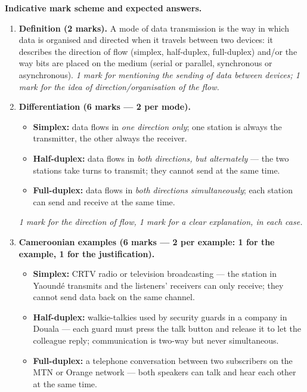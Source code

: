 \documentclass[11pt]{article}
\begin{document}
\begin{corrige}
\textbf{Indicative mark scheme and expected answers.}

\begin{enumerate}
\item \textbf{Definition (2 marks).} A mode of data transmission is the way in which data is organised and directed when it travels between two devices: it describes the direction of flow (simplex, half-duplex, full-duplex) and/or the way bits are placed on the medium (serial or parallel, synchronous or asynchronous). \emph{1 mark for mentioning the sending of data between devices; 1 mark for the idea of direction/organisation of the flow.}

\item \textbf{Differentiation (6 marks — 2 per mode).}
\begin{itemize}
\item \textbf{Simplex:} data flows in \emph{one direction only}; one station is always the transmitter, the other always the receiver.
\item \textbf{Half-duplex:} data flows in \emph{both directions, but alternately} — the two stations take turns to transmit; they cannot send at the same time.
\item \textbf{Full-duplex:} data flows in \emph{both directions simultaneously}; each station can send and receive at the same time.
\end{itemize}
\emph{1 mark for the direction of flow, 1 mark for a clear explanation, in each case.}

\item \textbf{Cameroonian examples (6 marks — 2 per example: 1 for the example, 1 for the justification).}
\begin{itemize}
\item \textbf{Simplex:} CRTV radio or television broadcasting — the station in Yaoundé transmits and the listeners' receivers can only receive; they cannot send data back on the same channel.
\item \textbf{Half-duplex:} walkie-talkies used by security guards in a company in Douala — each guard must press the talk button and release it to let the colleague reply; communication is two-way but never simultaneous.
\item \textbf{Full-duplex:} a telephone conversation between two subscribers on the MTN or Orange network — both speakers can talk and hear each other at the same time.
\end{itemize}


\end{enumerate}
\end{corrige}
\end{document}
